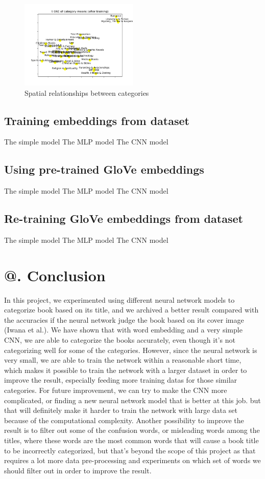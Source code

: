 \documentclass[jou,apacite, 10px]{apa6}
\makeatletter
\newcommand*{\rom}[1]{\expandafter\@slowromancap\romannumeral #1@}
\makeatother
\begin{document}
\begin{figure}[h!]
    \centering
     \includegraphics[width=0.5\textwidth]{images/tsne-categories-small}
        \caption{Spatial relationships between categories}
\end{figure}

\subsection{Training embeddings from dataset}
The simple model
The MLP model
The CNN model

\subsection {Using pre-trained GloVe embeddings}
The simple model
The MLP model
The CNN model

\subsection {Re-training GloVe embeddings from dataset}
The simple model
The MLP model
The CNN model

\section{\rom{6}. Conclusion}
In this project, we experimented using different neural network models to categorize book based on its title, and we archived a better result compared with the accuracies if the neural network judge the book based on its cover image (Iwana et al.). We have shown that with word embedding and a very simple CNN, we are able to categorize the books accurately, even though it's not categorizing well for some of the categories. However, since the neural network is very small, we are able to train the network within a reasonable short time, which makes it possible to train the network with a larger dataset in order to improve the result, especially feeding more training datas for those similar categories. For future improvement, we can try to make the CNN more complicated, or finding a new neural network model that is better at this job. but that will definitely make it harder to train the network with large data set because of the computational complexity. Another possibility to improve the result is to filter out some of the confusion words, or misleading words among the titles, where these words are the most common words that will cause a book title to be incorrectly categorized, but that's beyond the scope of this project as that requires a lot more data pre-processing and experiments on which set of words we should filter out in order to improve the result.
\end{document}
